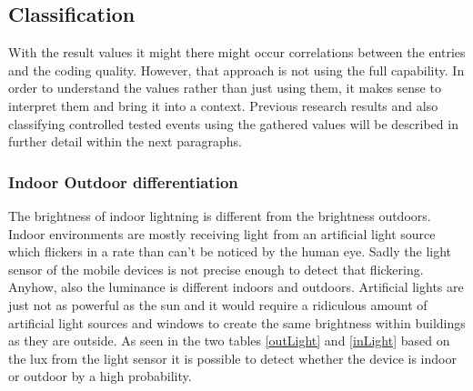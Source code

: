\subsection{Classification}
With the result values it might there might occur correlations between the entries and the coding quality. However, that approach is not using the full capability. In order to understand the values rather than just using them, it makes sense to interpret them and bring it into a context. Previous research results and also classifying controlled tested events using the gathered values will be described in further detail within the next paragraphs.

\subsubsection{Indoor Outdoor differentiation}
The brightness of indoor lightning is different from the brightness outdoors. Indoor environments are mostly receiving light from an artificial light source which flickers in a rate than can't be noticed by the human eye. Sadly the light sensor of the mobile devices is not precise enough to detect that flickering. Anyhow, also the luminance is different indoors and outdoors. Artificial lights are just not as powerful as the sun and it would require a ridiculous amount of artificial light sources and windows to create the same brightness within buildings as they are outside. 
As seen in the two tables \ref{outLight} and \ref{inLight} based on the lux from the light sensor it is possible to detect whether the device is indoor or outdoor by a high probability.

